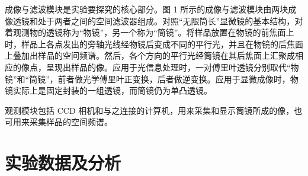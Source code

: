 \documentclass[a4paper]{article}
\begin{document}
\hspace{2em}成像与滤波模块是实验要探究的核心部分。图 1 所示的成像与滤波模块由两块成像透镜和处于两者之间的空间滤波器组成。对照“无限筒长”显微镜的基本结构，对着观测物的透镜称为“物镜”，另一个称为“筒镜”。将样品放置在物镜的前焦面上时，样品上各点发出的旁轴光线经物镜后变成不同的平行光，并且在物镜的后焦面上叠加出样品的空间频谱。然后，各个方向的平行光经筒镜在其后焦面上汇聚成相应的像点，呈现出样品的像。应用于光信息处理时，一对傅里叶透镜分别取代“物镜”和“筒镜”，前者做光学傅里叶正变换，后者做逆变换。应用于显微成像时，物镜实际上是固定封装的一组透镜，而筒镜仍为单凸透镜。\par

\hspace{2em}观测模块包括 CCD 相机和与之连接的计算机，用来采集和显示筒镜所成的像，也可用来采集样品的空间频谱。\par

\section{实验数据及分析}

\end{document}
